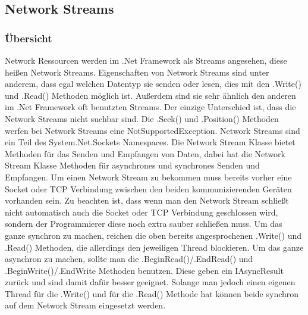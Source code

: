 \subsection{Network Streams} \label{ns}
\subsubsection{Übersicht}
Network Ressourcen werden im .Net Framework als Streams angesehen, diese heißen Network Streams. Eigenschaften von Network Streams sind unter anderem, dass egal welchen Datentyp sie senden oder lesen, dies mit den .Write() und .Read() Methoden möglich ist. Außerdem sind sie sehr ähnlich den anderen im .Net Framework oft benutzten Streams. Der einzige Unterschied ist, dass die Network Streams nicht suchbar sind. Die .Seek() und .Position() Methoden werfen bei Network Streams eine NotSupportedException. Network Streams sind ein Teil des System.Net.Sockets Namespaces. Die Network Stream Klasse bietet Methoden für das Senden und Empfangen von Daten, dabei hat die Network Stream Klasse Methoden für asynchrones und synchrones Senden und Empfangen. Um einen Network Stream zu bekommen muss bereits vorher eine Socket oder TCP Verbindung zwischen den beiden kommunizierenden Geräten vorhanden sein. Zu beachten ist, dass wenn man den Network Stream schließt nicht automatisch auch die Socket oder TCP Verbindung geschlossen wird, sondern der Programmierer diese noch extra sauber schließen muss. Um das ganze synchron zu machen, reichen die oben bereits angesprochenen .Write() und .Read() Methoden, die allerdings den jeweiligen Thread blockieren. Um das ganze asynchron zu machen, sollte man die .BeginRead()/.EndRead() und .BeginWrite()/.EndWrite Methoden benutzen. Diese geben ein IAsyncResult zurück und sind damit dafür besser geeignet. Solange man jedoch einen eigenen Thread für die .Write() und für die .Read() Methode hat können beide synchron auf dem Network Stream eingesetzt werden.
